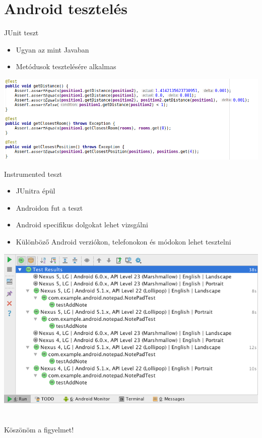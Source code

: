 \documentclass{beamer}
\begin{document}
\section{Android tesztelés}
\begin{frame}[fragile]{JUnit teszt}
	\begin{minipage}{1\textheight}
		\begin{itemize}
			\item Ugyan az mint Javaban
			\item Metódusok tesztelésére alkalmas
		\end{itemize}
	\end{minipage}
	\begin{minipage}{1\textwidth}
		\includegraphics[width=1\linewidth]{figures/junittest.png}
	\end{minipage}
\end{frame}
\begin{frame}[fragile]{Instrumented teszt}
	\begin{minipage}{0.9\textwidth}
		\begin{itemize}
			\item JUnitra épül
			\item Androidon fut a teszt
			\item Android specifikus dolgokat lehet vizsgálni
			\item Különböző Android verziókon, telefonokon és módokon lehet tesztelni 
		\end{itemize}
	\end{minipage}
	\begin{minipage}{1\textwidth}
	\includegraphics[width=1\linewidth]{figures/ctl-test-results.png}
\end{minipage}
\end{frame}


\section{}
\begin{frame}
\centering
\LARGE Köszönöm a figyelmet!
\end{frame}
\end{document}
